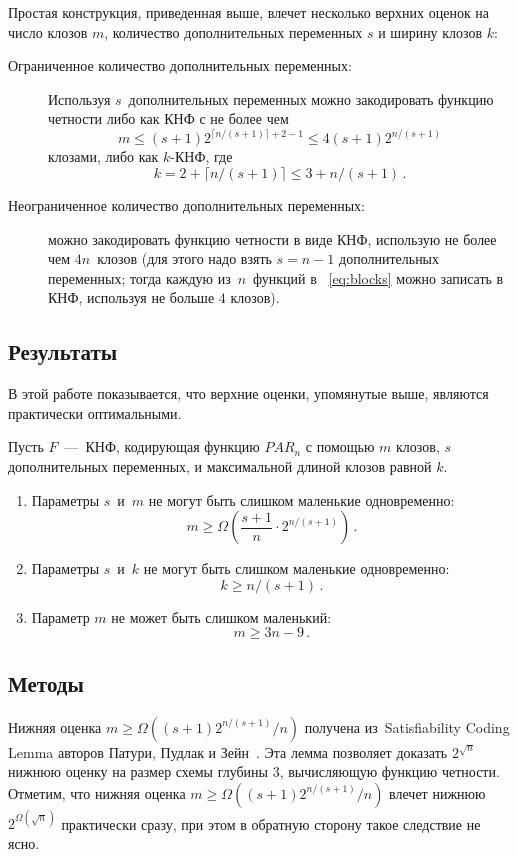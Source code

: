 Простая конструкция, приведенная выше, влечет несколько верхних оценок 
на число клозов $m$, количество дополнительных переменных $s$ и ширину клозов $k$:
\begin{description}
	\item[Ограниченное количество дополнительных переменных:]
	Используя $s$~дополнительных переменных можно закодировать функцию четности либо как 
	КНФ с не более чем \[m \le (s+1)2^{\lceil n/(s+1) \rceil+2-1} \le 4(s+1)2^{n/(s+1)}\] клозами, либо как $k$-КНФ, где  \[k=2+{\lceil n/(s+1) \rceil} \le 3+n/(s+1) \, .\]
	\item[Неограниченное количество дополнительных переменных:] можно закодировать функцию четности в виде КНФ, использую не более чем $4n$~клозов (для этого надо взять $s=n-1$ дополнительных переменных; тогда каждую из~$n$~функций в ~\eqref{eq:blocks} можно записать в КНФ, используя не больше $4$ клозов).
\end{description}
\subsection{Результаты}
В этой работе показывается, что верхние оценки, упомянутые выше, являются практически оптимальными. 
\begin{theorem}\label{thm:main}
	Пусть $F$~---~КНФ, кодирующая функцию $PAR_n$ с помощью $m$ клозов, 
	$s$ дополнительных переменных, и максимальной длиной клозов равной $k$.
	\begin{enumerate}
		\item Параметры $s$~и~$m$ не могут быть слишком маленькие одновременно:
		\begin{equation}\label{eq:sm}
			m \ge \Omega\left(\frac{s+1}{n} \cdot 2^{n/(s+1)}\right) \, .
		\end{equation}
		\item Параметры $s$~и~$k$ не могут быть слишком маленькие одновременно:
		\begin{equation}\label{eq:sw}
			k \ge n/(s+1) \, .
		\end{equation}
		\item Параметр $m$ не может быть слишком маленький:
		\begin{equation}\label{eq:m}
			m \ge 3n-9 \, .
		\end{equation}
	\end{enumerate}
\end{theorem}

\subsection{Методы}
Нижняя оценка $m \ge \Omega((s+1)2^{n/(s+1)}/n)$ получена 
из~Satisfiability Coding Lemma авторов Патури, Пудлак и Зейн~\cite{DBLP:journals/cjtcs/PaturiPZ99}. 
Эта лемма позволяет доказать $2^{\sqrt{n}}$ нижнюю оценку на размер схемы глубины $3$, вычисляющую функцию четности. 
Отметим, что нижняя оценка $m \ge \Omega((s+1)2^{n/(s+1)}/n)$ влечет нижнюю $2^{\Omega(\sqrt n)}$ практически сразу,
при этом в обратную сторону такое следствие не ясно.

